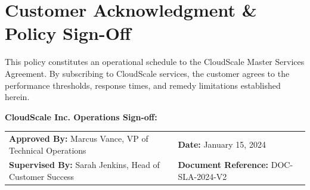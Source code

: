 \documentclass[10pt,letterpaper]{article}
\begin{document}
\section{Customer Acknowledgment \& Policy Sign-Off}
This policy constitutes an operational schedule to the CloudScale Master Services Agreement. By subscribing to CloudScale services, the customer agrees to the performance thresholds, response times, and remedy limitations established herein.

\vspace{2pt}

\begin{tcolorbox}[colback=white,colframe=accentborder]
\small
\textbf{CloudScale Inc. Operations Sign-off:}\\[2pt]
\begin{tabularx}{\linewidth}{@{}X X@{}}
\textbf{Approved By:} Marcus Vance, VP of Technical Operations & \textbf{Date:} January 15, 2024 \\
\textbf{Supervised By:} Sarah Jenkins, Head of Customer Success & \textbf{Document Reference:} DOC-SLA-2024-V2
\end{tabularx}
\end{tcolorbox}
\end{document}
